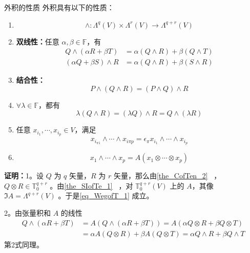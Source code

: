\begin{theorem}{外积的性质}
外积具有以下的性质：
\begin{enumerate}
\item \begin{equation}\label{eq_WegofT_1}
\wedge:\Lambda^q(V)\times\Lambda^r(V)\rightarrow\Lambda^{q+r}(V)
\end{equation}
\item \textbf{双线性：}任意 $\alpha,\beta\in\mathbb F$，有
\begin{equation}
\begin{aligned}
Q\wedge(\alpha R+\beta T)&=\alpha(Q\wedge R)+\beta(Q\wedge T)\\
(\alpha Q+\beta S)\wedge R&=\alpha (Q\wedge R)+\beta (S\wedge R)
\end{aligned}
\end{equation}
\item \textbf{结合性：}
\begin{equation}
P\wedge (Q\wedge R)=(P\wedge Q)\wedge R
\end{equation}
\item $\forall \lambda\in\mathbb F$，都有
\begin{equation}\label{eq_WegofT_4}
\lambda(Q\wedge R)=(\lambda Q)\wedge R=Q\wedge(\lambda R)
\end{equation}

\item 任意 $x_{i_1},\cdots,x_{i_p}\in V$，满足
\begin{equation}\label{eq_WegofT_6}
x_{i_{\pi 1}}\wedge\cdots \wedge x_{i\pi p}=\epsilon_\pi x_{i_1}\wedge\cdots\wedge x_{i_p}
\end{equation}
\item 
\begin{equation}\label{eq_WegofT_5}
x_1\wedge\cdots\wedge x_p=A(x_1\otimes\cdots\otimes x_p)
\end{equation}
\end{enumerate}

\end{theorem}
\textbf{证明：}1。设 $Q$ 为 $q$ 矢量，$R$ 为 $r$ 矢量，那么由\autoref{the_CofTen_2}~ ， $Q\otimes R\in\mathbb T_0^{q+r}$ 。由\autoref{the_SIofTe_1}~ ，对 $\mathbb T_0^{q+r}(V)$ 上的 $A$，其像 $\Im A=\Lambda ^{q+r}(V)$ 。于是\autoref{eq_WegofT_1} 成立。

2。由张量积和 $A$ 的线性
\begin{equation}
\begin{aligned}
Q\wedge(\alpha R+\beta T)&=A(Q\wedge(\alpha R+\beta T))=A(\alpha Q\otimes R+\beta Q\otimes T)\\
&=\alpha A(Q\otimes R)+\beta A(Q\otimes T)=\alpha Q\wedge R+\beta Q\wedge T
\end{aligned}
\end{equation}
第2式同理。

